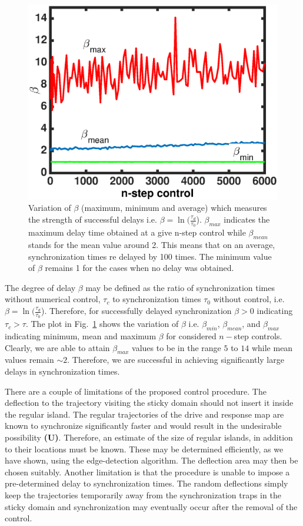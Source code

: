 \documentclass[reprint,superscriptaddress,amsmath,amssymb,aps,pre]{revtex4-1}
\begin{document}
\begin{figure}[t]
	\includegraphics[scale=0.45]{Strength_con.eps}
	\caption{\label{fig:Strength_con}\footnotesize Variation of $\beta$ 
		(maximum, minimum and average) which measures the strength of successful 
		delays i.e. $\beta = \ln(\frac{\tau_d}{\tau_0}$). $\beta_{max}$ 
		indicates the maximum delay time obtained at a give n-step control 
		while $\beta_{mean}$ stands for the mean value around 2. This means 
		that on an average, synchronization times re delayed by 100 times. The 
		minimum value of $\beta$ remains 1 for the cases when no delay was 
		obtained. }
\end{figure}


The degree of delay $\beta$ may be defined as the ratio of synchronization times without numerical control, $\tau_c$ to synchronization times $\tau_0$ without control, i.e. $\beta =  \ln(\frac{\tau_d}{\tau_0}$).  Therefore, for successfully delayed synchronization $\beta>0$ indicating $\tau_c > \tau$. 
The plot in Fig.~\ref{fig:Strength_con} shows the variation of $\beta$ i.e. 
$\beta_{min}$, $\beta_{mean}$, and $\beta_{max}$  indicating minimum, mean 
and maximum $\beta$ for considered $n-$step controls. Clearly, we are able 
to attain $\beta_{max}$ values to be in the range $5$ to $14$ while mean 
values remain $\sim2$. Therefore, we are successful in achieving 
significantly large delays in synchronization times. 


There are a couple of limitations of the proposed control procedure. The deflection to the trajectory visiting the sticky domain should not insert it inside the regular island. The regular trajectories of the drive and response map are known to synchronize significantly faster and would result in the undesirable possibility \textbf{(U)}. Therefore, an estimate of the size of regular islands, in addition to their locations must be known. These may be determined efficiently, as we have shown, using the edge-detection algorithm. The deflection area  may then be chosen suitably.  Another limitation is that the procedure is unable to impose a pre-determined delay to synchronization times. The random deflections simply keep the trajectories temporarily away from the synchronization traps in the sticky domain and synchronization may eventually occur after the removal of the control. 
\end{document}
